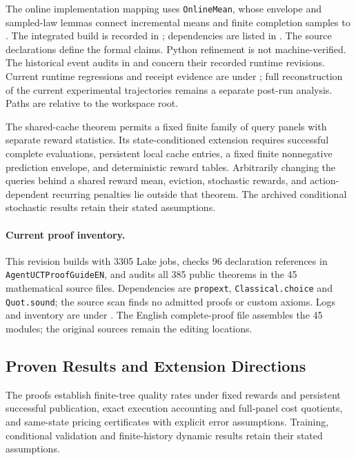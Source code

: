The online implementation mapping uses \texttt{OnlineMean}, whose envelope and
sampled-law lemmas connect incremental means and finite completion samples to
. The integrated build is recorded
in ; dependencies are listed in
. The source declarations define
the formal claims. Python refinement is not machine-verified. The historical
event audits in  and
 concern their recorded runtime revisions.
Current runtime regressions and receipt evidence are under
; full reconstruction of the current experimental
trajectories remains a separate post-run analysis. Paths are relative to the
workspace root.

The shared-cache theorem permits a fixed finite family of query panels with separate reward statistics. Its state-conditioned extension requires successful complete evaluations, persistent local cache entries, a fixed finite nonnegative prediction envelope, and deterministic reward tables. Arbitrarily changing the queries behind a shared reward mean, eviction, stochastic rewards, and action-dependent recurring penalties lie outside that theorem. The archived conditional stochastic results retain their stated assumptions.

\paragraph{Current proof inventory.}
This revision builds with 3305 Lake jobs, checks 96 declaration references in
\texttt{AgentUCTProofGuideEN}, and audits all 385 public theorems in the 45
mathematical source files. Dependencies are \texttt{propext},
\texttt{Classical.choice} and \texttt{Quot.sound}; the source scan finds no
admitted proofs or custom axioms. Logs and inventory are under
. The English complete-proof
file assembles the 45 modules; the original sources remain the editing locations.

\subsection{Proven Results and Extension Directions}
\label{app:results-extensions}
The proofs establish finite-tree quality rates under fixed rewards and
persistent successful publication, exact execution accounting and full-panel
cost quotients, and same-state pricing certificates with explicit error
assumptions. Training, conditional validation and finite-history dynamic
results retain their stated assumptions.

